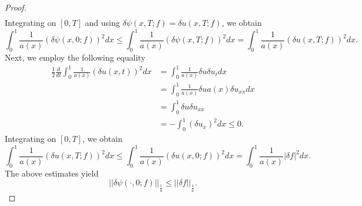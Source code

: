 \documentclass[reqno]{amsart}
\theoremstyle{plain}
\theoremstyle{remark}
\numberwithin{equation}{section}
\begin{document}
\begin{proof}
\begin{equation*}
\begin{aligned}
    \end{aligned}
\end{equation*}
Integrating on $[0,T]$ and using $\delta \psi(x,T;f)=\delta u(x,T;f)$, we obtain
$$\int_{0}^1 \frac{1}{a(x)}\left(\delta \psi(x,0;f)\right)^2 dx \leqslant \int_{0}^1 \frac{1}{a(x)}\left(\delta \psi(x,T;f)\right)^2 dx=  \int_{0}^1 \frac{1}{a(x)}\left(\delta u(x,T;f)\right)^2 dx.$$
Next, we employ the following equality
\begin{equation*}
  \begin{aligned}
        \frac{1}{2} \frac{d}{dt}\int_{0}^1 \frac{1}{a(x)}\left(\delta u(x,t)\right)^2 dx&= \int_{0}^1 \frac{1}{a(x)}\delta u \delta u_{t} dx\\& =\int_{0}^1 \frac{1}{a(x)}\delta u a(x) \delta u_{xx} dx\\&= \int_{0}^1 \delta u\delta u_{xx}\\&=- \int_{0}^1 (\delta u_{x})^2 dx \leqslant 0.
  \end{aligned}  
\end{equation*}
Integrating on $[0,T]$, we obtain 
$$\int_{0}^1 \frac{1}{a(x)}\left(\delta u(x,T;f)\right)^2 dx \leqslant \int_{0}^1 \frac{1}{a(x)}\left(\delta u(x,0;f)\right)^2 dx= \int_{0}^1 \frac{1}{a(x)}\vert\delta f\vert^2 dx.$$
The above estimates yield
$$\vert\vert\delta \psi(\cdot,0;f)\vert\vert_{\frac{1}{a}}\leqslant  \vert\vert\delta f\vert\vert_{\frac{1}{a}}.$$
\end{proof}
\end{document}
